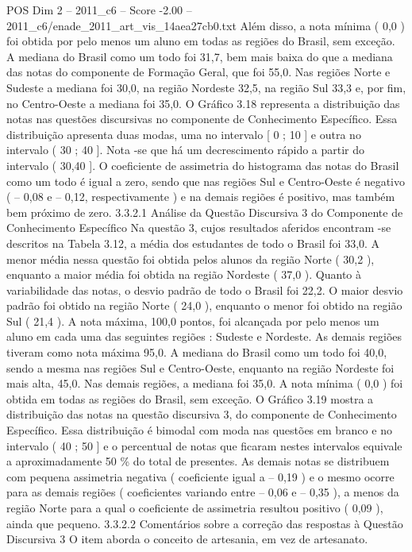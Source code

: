 \begin{textsample}{POS Dim 2 – 2011\_c6 – Score -2.00 – 2011\_c6/enade\_2011\_art\_vis\_14aea27cb0.txt}
Além disso, a nota mínima ( 0,0 ) foi obtida por pelo menos um aluno em todas as regiões do Brasil, sem exceção.
A mediana do Brasil como um todo foi 31,7, bem mais baixa do que a mediana das notas do componente de Formação Geral, que foi 55,0.
Nas regiões Norte e Sudeste a mediana foi 30,0, na região Nordeste 32,5, na região Sul 33,3 e, por fim, no Centro-Oeste a mediana foi 35,0.
O Gráfico 3.18 representa a distribuição das notas nas questões discursivas no componente de Conhecimento Específico.
Essa distribuição apresenta duas modas, uma no intervalo [ 0 ; 10 ] e outra no intervalo ( 30 ; 40 ].
Nota -se que há um decrescimento rápido a partir do intervalo ( 30,40 ].
O coeficiente de assimetria do histograma das notas do Brasil como um todo é igual a zero, sendo que nas regiões Sul e Centro-Oeste é negativo ( – 0,08 e – 0,12, respectivamente ) e na demais regiões é positivo, mas também bem próximo de zero. 3.3.2.1 Análise da Questão Discursiva 3 do Componente de Conhecimento Específico Na questão 3, cujos resultados aferidos encontram -se descritos na Tabela 3.12, a média dos estudantes de todo o Brasil foi 33,0.
A menor média nessa questão foi obtida pelos alunos da região Norte ( 30,2 ), enquanto a maior média foi obtida na região Nordeste ( 37,0 ).
Quanto à variabilidade das notas, o desvio padrão de todo o Brasil foi 22,2.
O maior desvio padrão foi obtido na região Norte ( 24,0 ), enquanto o menor foi obtido na região Sul ( 21,4 ).
A nota máxima, 100,0 pontos, foi alcançada por pelo menos um aluno em cada uma das seguintes regiões : Sudeste e Nordeste.
As demais regiões tiveram como nota máxima 95,0.
A mediana do Brasil como um todo foi 40,0, sendo a mesma nas regiões Sul e Centro-Oeste, enquanto na região Nordeste foi mais alta, 45,0.
Nas demais regiões, a mediana foi 35,0.
A nota mínima ( 0,0 ) foi obtida em todas as regiões do Brasil, sem exceção.
O Gráfico 3.19 mostra a distribuição das notas na questão discursiva 3, do componente de Conhecimento Específico.
Essa distribuição é bimodal com moda nas questões em branco e no intervalo ( 40 ; 50 ] e o percentual de notas que ficaram nestes intervalos equivale a aproximadamente 50 \% do total de presentes.
As demais notas se distribuem com pequena assimetria negativa ( coeficiente igual a – 0,19 ) e o mesmo ocorre para as demais regiões ( coeficientes variando entre – 0,06 e – 0,35 ), a menos da região Norte para a qual o coeficiente de assimetria resultou positivo ( 0,09 ), ainda que pequeno. 3.3.2.2 Comentários sobre a correção das respostas à Questão Discursiva 3 O item aborda o conceito de artesania, em vez de artesanato.

\end{textsample}
